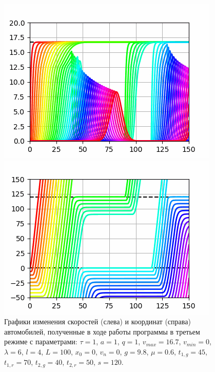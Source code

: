 \documentclass[12pt, a4paper]{extarticle}
\numberwithin{equation}{section}
\numberwithin{figure}{section}
\begin{document}
\begin{figure}[H]
	\begin{center}
		\begin{minipage}[h]{0.48\linewidth}
			\includegraphics[width=1\linewidth]
			{Im/third_mode_speed}
		\end{minipage}
		\hfill 
		\begin{minipage}[h]{0.48\linewidth}
			\includegraphics[width=1\linewidth]
			{Im/third_mode_distance}
		\end{minipage}
	\caption{Графики изменения скоростей (слева) и координат (справа) автомобилей, полученные в ходе работы программы в третьем режиме с параметрами: $\tau=1$, $a=1$, $q=1$, $v_{max}=16.7$, $v_{min}=0$, $\lambda=6$, $l=4$, $L=100$, $x_0=0$, $v_n=0$, $g=9.8$, $\mu=0.6$, $t_{1,g}=45$, $t_{1,r}=70$, $t_{2,g}=40$, $t_{2,r}=50$, $s=120$. }
	\label{third_mode}
	\end{center}
\end{figure}
\end{document}
